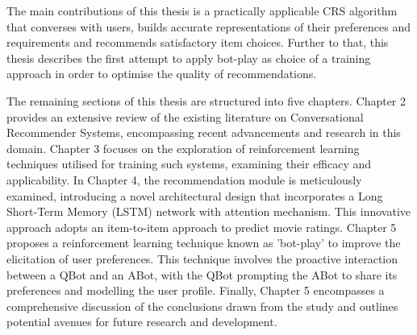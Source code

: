 The main contributions of this thesis is a practically applicable CRS algorithm that converses with users, builds accurate representations of their preferences and requirements and recommends satisfactory item choices. Further to that, this thesis describes the first attempt to apply bot-play as choice of a training approach in order to optimise the quality of recommendations.

The remaining sections of this thesis are structured into five chapters. Chapter 2 provides an extensive review of the existing literature on Conversational Recommender Systems, encompassing recent advancements and research in this domain. Chapter 3 focuses on the exploration of reinforcement learning techniques utilised for training such systems, examining their efficacy and applicability. In Chapter 4, the recommendation module is meticulously examined, introducing a novel architectural design that incorporates a Long Short-Term Memory (LSTM) network with attention mechanism. This innovative approach adopts an item-to-item approach to predict movie ratings. Chapter 5 proposes a reinforcement learning technique known as 'bot-play' to improve the elicitation of user preferences. This technique involves the proactive interaction between a QBot and an ABot, with the QBot prompting the ABot to share its preferences and modelling the user profile. Finally, Chapter 5 encompasses a comprehensive discussion of the conclusions drawn from the study and outlines potential avenues for future research and development.
